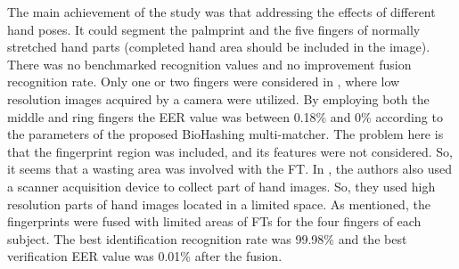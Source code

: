 \documentclass[review]{elsarticle}
\begin{document}
	The main achievement of the \cite{ying2007identity} study was that addressing the effects of different hand poses. It could segment the palmprint and the five fingers of normally stretched hand parts (completed hand area should be included in the image). There was no benchmarked recognition values and no improvement fusion recognition rate. 
	Only one or two fingers were considered in \cite{nanni2009multi}, where low resolution images acquired by a camera were utilized. By employing both the middle and ring fingers the EER value was between 0.18\% and 0\% according to the parameters of the proposed BioHashing multi-matcher. The problem here is that the fingerprint region was included, and its features were not considered. So, it seems that a wasting area was involved with the FT.
	In \cite{Pavesic2009Finger-based}, the authors also used a scanner acquisition device to collect part of hand images. So, they used high resolution parts of hand images located in a limited space. As mentioned, the fingerprints were fused with limited areas of FTs for the four fingers of each subject. The best identification recognition rate was 99.98\% and the best verification EER value was 0.01\% after the fusion.
\end{document}
